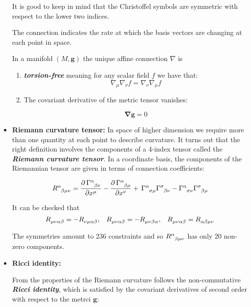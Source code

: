 \documentclass[12pt]{article}
\renewcommand{\vec}[1]{\bm{#1}}
\numberwithin{equation}{section}
\numberwithin{theorem}{subsection}
\begin{document}
\begin{itemize}
It is good to keep in mind that the Christoffel symbols are symmetric with respect to the lower two indices. 

The connection indicates the rate at which the basis vectors are changing at each point in space.

In a manifold $(M,\vec{g})$ the unique affine connection $\nabla$ is \begin{enumerate}

    \item \textbf{\textit{torsion-free}} meaning  for any scalar field $f$ we have that: $$\nabla_{\mu}\nabla_{\nu}f = \nabla_{\nu}\nabla_{\mu}f$$

    \item The covariant derivative of the metric tensor vanishes:

    $$\vec{\nabla g} = 0$$

\end{enumerate}

\item \textbf{Riemann curvature tensor:} In space of higher dimension we require more than one quantity at each point to describe curvature. It turns out that the right definition involves the components of a 4-index tensor called the \textbf{\textit{Riemann curvature tensor}}. In a coordinate basis, the components of the Riemannian tensor are given in terms of connection coefficients:

$$\tensor{R}{^\alpha_\beta_\mu_\nu} = \frac{\partial \, \tensor{\Gamma}{^\alpha_\beta_\nu}}{\partial x^{\mu}} - \frac{\partial \, \tensor{\Gamma}{^\alpha_\beta_\mu}}{\partial x^{\nu}} + \, \tensor{\Gamma}{^\alpha_\sigma_\mu} \tensor{\Gamma}{^\sigma_\beta_\nu} -  \tensor{\Gamma}{^\alpha_\sigma_\nu} \tensor{\Gamma}{^\sigma_\beta_\mu}$$

It can be checked that \[\tensor{R}{_\mu_\nu_\alpha_\beta} = -\tensor{R}{_\nu_\mu_\alpha_\beta}, \; \; \; \tensor{R}{_\mu_\nu_\alpha_\beta} = - \tensor{R}{_\mu_\nu_\beta_\alpha}, \; \; \; \tensor{R}{_\mu_\nu_\alpha_\beta} = \tensor{R}{_\alpha_\beta_\mu_\nu} \]

The symmetries amount to 236 constraints and so $\tensor{R}{^\alpha_\beta_\mu_\nu}$ has only 20 non-zero components.

\item\textbf{Ricci identity:} 

From the properties of the Riemann curvature follows the non-commutative \textbf{\textit{Ricci identity}}, which is satisfied by the covariant derivatives of second order with respect to the metrci $\vec{g}$:


\end{itemize}
\end{document}
